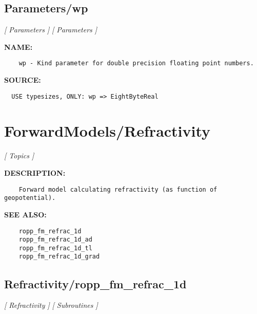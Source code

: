 \subsection{Parameters/wp}
\textsl{[ Parameters ]}
\textsl{[ Parameters ]}

\label{ch:robo70}
\label{ch:Parameters_wp}
\textbf{NAME:}\hspace{0.08in}\begin{Verbatim}
    wp - Kind parameter for double precision floating point numbers.
\end{Verbatim}
\textbf{SOURCE:}\hspace{0.08in}\begin{Verbatim}
  USE typesizes, ONLY: wp => EightByteReal
\end{Verbatim}
\section{ForwardModels/Refractivity}
\textsl{[ Topics ]}

\label{ch:robo46}
\label{ch:ForwardModels_Refractivity}
\textbf{DESCRIPTION:}\hspace{0.08in}\begin{Verbatim}
    Forward model calculating refractivity (as function of geopotential).
\end{Verbatim}
\textbf{SEE ALSO:}\hspace{0.08in}\begin{Verbatim}
    ropp_fm_refrac_1d
    ropp_fm_refrac_1d_ad
    ropp_fm_refrac_1d_tl
    ropp_fm_refrac_1d_grad
\end{Verbatim}
\subsection{Refractivity/ropp\_fm\_refrac\_1d}
\textsl{[ Refractivity ]}
\textsl{[ Subroutines ]}

